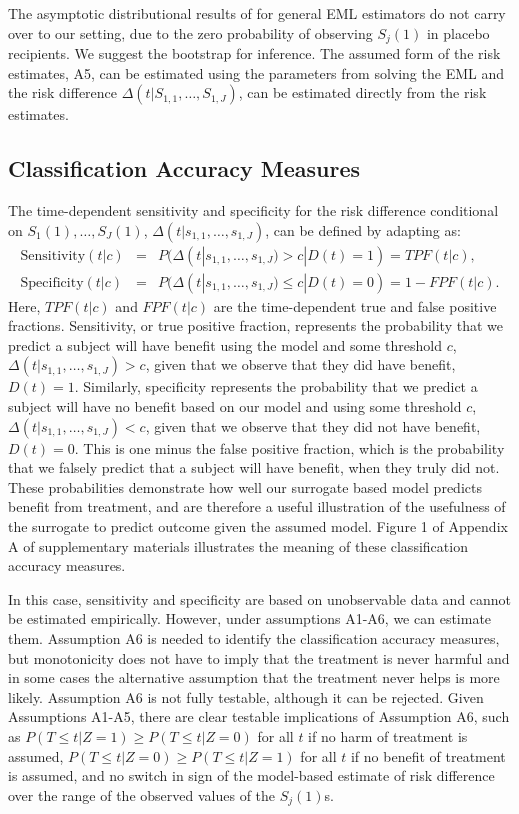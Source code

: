 \documentclass[times, doublespace]{simauth}
\begin{document}
The asymptotic distributional results of \citet{Pepe91} for general EML estimators do not carry over to our setting, due to the zero probability of observing $S_{j}(1)$ in placebo recipients. We suggest the bootstrap for inference. The assumed form of the risk estimates, A5, can be estimated using the parameters from solving the EML and the risk difference $\Delta(t|S_{1,1}, \dots, S_{1,J})$, can be estimated directly from the risk estimates. 

\subsection{Classification Accuracy Measures} \label{CAM}
The time-dependent sensitivity and specificity for the risk difference conditional on $S_{1}(1), \dots, S_{J}(1)$, $\Delta(t|s_{1,1}, \dots, s_{1,J})$, can be defined by adapting \citet{Heagerty00} as:
\begin{eqnarray*}
\mbox{Sensitivity}(t|c)&=&P(\Delta(t|s_{1,1}, \dots, s_{1,J}) > c|D(t)=1)=TPF(t|c),\\
\mbox{Specificity}(t|c)&=&P(\Delta(t|s_{1,1}, \dots, s_{1,J}) \leq c|D(t)=0)=1-FPF(t|c).
\end{eqnarray*}
Here, $TPF(t|c)$ and $FPF(t|c)$ are the time-dependent true and false positive fractions. Sensitivity, or true positive fraction, represents the probability that we predict a subject will have benefit using the model and some threshold $c$, $\Delta(t|s_{1,1}, \dots, s_{1,J}) > c$, given that we observe that they did have benefit, $D(t)=1$. Similarly, specificity represents the probability that we predict a subject will have no benefit based on our model and using some threshold $c$, $\Delta(t|s_{1,1}, \dots, s_{1,J}) < c$, given that we observe that they did not have benefit, $D(t)=0$. This is one minus the false positive fraction, which is the probability that we falsely predict that a subject will have benefit, when they truly did not. These probabilities demonstrate how well our surrogate based model predicts benefit from treatment, and are therefore a useful illustration of the usefulness of the surrogate to predict outcome given the assumed model. Figure 1 of Appendix A of supplementary materials illustrates the meaning of these classification accuracy measures. 

In this case, sensitivity and specificity are based on unobservable data and cannot be estimated empirically. However, under assumptions A1-A6, we can estimate them. Assumption A6 is needed to identify the classification accuracy measures, but monotonicity does not have to imply that the treatment is never harmful and in some cases the alternative assumption that the treatment never helps is more likely. Assumption A6 is not fully testable, although it can be rejected. Given Assumptions A1-A5, there are clear testable implications of Assumption A6, such as $P(T\leq t|Z=1)\geq P(T\leq t|Z=0)$ for all $t$ if no harm of treatment is assumed, $P(T \leq t|Z=0) \geq P(T\leq t|Z=1)$ for all $t$ if no benefit of treatment is assumed, and no switch in sign of the model-based estimate of risk difference over the range of the observed values of the $S_j(1)$s. 
\end{document}
